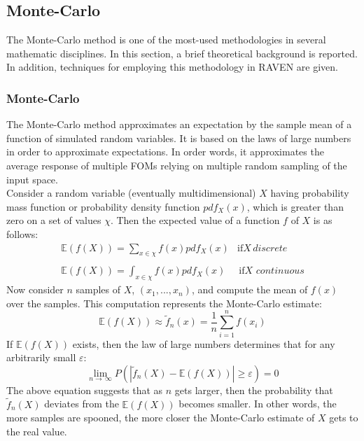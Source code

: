 \subsection{Monte-Carlo}
\label{sub:MC}
The Monte-Carlo method is one of the most-used methodologies in several mathematic disciplines. In this section, a brief theoretical
background is reported. In addition, techniques for employing this methodology in RAVEN are given.
\subsubsection{Monte-Carlo}
\label{subsub:MCtheory}
The Monte-Carlo method approximates an expectation by the sample mean of a function of
simulated random variables. It is based on the laws of large numbers in order to approximate expectations.
In order words, it approximates the average response of multiple FOMs
relying on multiple random sampling of the input space.
\\Consider a random variable (eventually multidimensional) $X$ having probability mass function or probability density function $pdf_{X}(x)$,
which is greater than zero on a set of values $\chi$. Then the expected value of a function $f$ of $X$ is as follows:
\begin{equation}
\begin{matrix}
\mathbb{E}(f(X)) =\sum_{x \in \chi} f(x)pdf_{X}(x) & \text{if} X \, discrete \\
\\
\mathbb{E}(f(X)) =\int_{x \in \chi} f(x)pdf_{X}(x) & \, \text{if} X \, \, continuous
\end{matrix}
\end{equation}
Now consider $n$ samples of $X$, $(x_{1},...,x_{n})$, and compute the mean of $f(x)$ over the samples. This computation represents the Monte-Carlo estimate:
\begin{equation}
  \mathbb{E}(f(X)) \approx   \widetilde{f}_{n}(x) = \frac{1}{n} \sum_{i=1}^{n} f(x_{i})
\end{equation}
If $\mathbb{E}(f(X))$ exists, then the law of large numbers determines that for any arbitrarily small $\varepsilon$:
\begin{equation}
  \lim_{n\rightarrow \, \infty} P( \left | \widetilde{f}_{n}(X) - \mathbb{E}(f(X))  \right |\geq \varepsilon) = 0
\end{equation}
The above equation suggests that as $n$ gets larger, then the probability that $\widetilde{f}_{n}(X)$ deviates
from the $\mathbb{E}(f(X))$ becomes smaller. In other words, the more samples are spooned, the more closer the Monte-Carlo estimate of $X$ gets to the real value.
